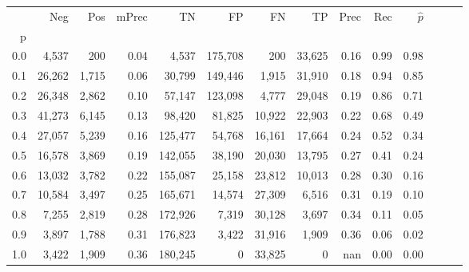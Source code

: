 \begin{tabular}{rrrrrrrrrrrrrr}
\toprule
{} &     Neg &    Pos & mPrec &       TN &       FP &      FN &      TP &  Prec &   Rec & $\hat{p}$ \\
p   &         &        &       &          &          &         &         &       &       &           \\
\midrule
0.0 &   4,537 &    200 &  0.04 &    4,537 &  175,708 &     200 &  33,625 &  0.16 &  0.99 &      0.98 \\
0.1 &  26,262 &  1,715 &  0.06 &   30,799 &  149,446 &   1,915 &  31,910 &  0.18 &  0.94 &      0.85 \\
0.2 &  26,348 &  2,862 &  0.10 &   57,147 &  123,098 &   4,777 &  29,048 &  0.19 &  0.86 &      0.71 \\
0.3 &  41,273 &  6,145 &  0.13 &   98,420 &   81,825 &  10,922 &  22,903 &  0.22 &  0.68 &      0.49 \\
0.4 &  27,057 &  5,239 &  0.16 &  125,477 &   54,768 &  16,161 &  17,664 &  0.24 &  0.52 &      0.34 \\
0.5 &  16,578 &  3,869 &  0.19 &  142,055 &   38,190 &  20,030 &  13,795 &  0.27 &  0.41 &      0.24 \\
0.6 &  13,032 &  3,782 &  0.22 &  155,087 &   25,158 &  23,812 &  10,013 &  0.28 &  0.30 &      0.16 \\
0.7 &  10,584 &  3,497 &  0.25 &  165,671 &   14,574 &  27,309 &   6,516 &  0.31 &  0.19 &      0.10 \\
0.8 &   7,255 &  2,819 &  0.28 &  172,926 &    7,319 &  30,128 &   3,697 &  0.34 &  0.11 &      0.05 \\
0.9 &   3,897 &  1,788 &  0.31 &  176,823 &    3,422 &  31,916 &   1,909 &  0.36 &  0.06 &      0.02 \\
1.0 &   3,422 &  1,909 &  0.36 &  180,245 &        0 &  33,825 &       0 &   nan &  0.00 &      0.00 \\
\bottomrule
\end{tabular}
